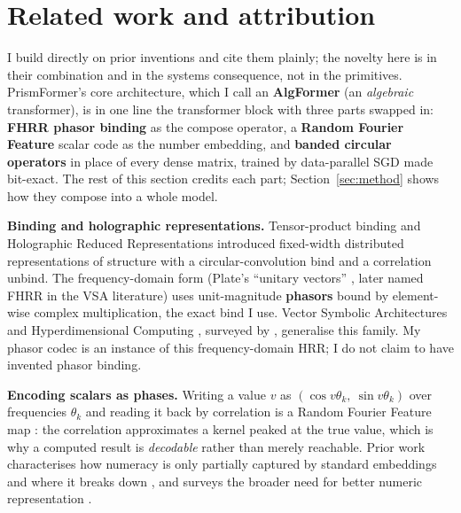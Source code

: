 \documentclass[11pt]{article}
\begin{document}
\section{Related work and attribution}\label{sec:related}

I build directly on prior inventions and cite them plainly; the novelty here is in their combination
and in the systems consequence, not in the primitives. PrismFormer's core architecture, which I call an \textbf{AlgFormer} (an
\emph{algebraic} transformer), is in one line the transformer
block \parencite{vaswani2017attention} with three parts swapped in: \textbf{FHRR phasor binding} \parencite{plate1994thesis,plate2003hrr} as the compose operator, a \textbf{Random Fourier Feature} scalar code \parencite{rahimi2007random} as
the number embedding, and \textbf{banded circular operators} \parencite{cheng2015circulant,sindhwani2015structured}
in place of every dense matrix, trained by data-parallel SGD \parencite{mcmahan2017fedavg} made bit-exact. The
rest of this section credits each part; Section~\ref{sec:method} shows how they compose into a whole
model.

\textbf{Binding and holographic representations.} Tensor-product binding \parencite{smolensky1990tensor} and
Holographic Reduced Representations \parencite{plate1995hrr} introduced fixed-width distributed representations of
structure with a circular-convolution bind and a correlation unbind. The frequency-domain form (Plate's
``unitary vectors'' \parencite{plate1994thesis,plate2003hrr}, later named FHRR in the VSA literature) uses unit-magnitude
\textbf{phasors} bound by element-wise complex multiplication, the exact bind I use. Vector Symbolic
Architectures \parencite{gayler2003vsa} and Hyperdimensional Computing \parencite{kanerva2009hdc}, surveyed by \textcite{kleyko2022vsa1,kleyko2023vsa2}, generalise this family. My phasor codec is an instance of this frequency-domain HRR; I do
not claim to have invented phasor binding.

\textbf{Encoding scalars as phases.} Writing a value $v$ as $(\cos v\theta_k,\ \sin v\theta_k)$ over
frequencies $\theta_k$ and reading it back by correlation is a Random Fourier Feature map \parencite{rahimi2007random}: the correlation approximates a kernel peaked at the true value, which is why a computed
result is \emph{decodable} rather than merely reachable. Prior work characterises how numeracy is only
partially captured by standard embeddings and where it breaks down \parencite{wallace2019numeracy}, and surveys
the broader need for better numeric representation \parencite{thawani2021numbers}.
\end{document}
